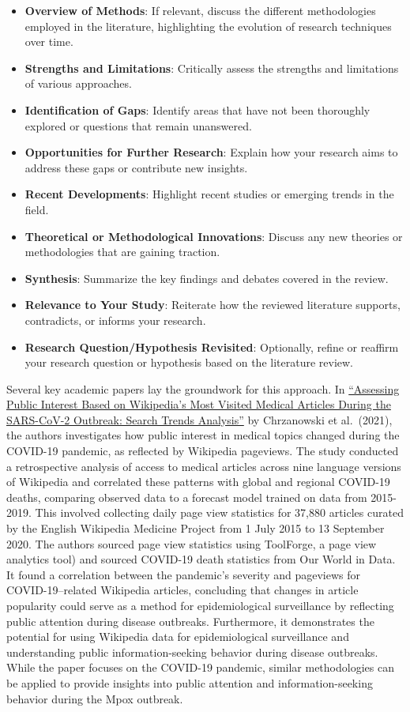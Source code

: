 \documentclass[
  12pt,
]{article}
\begin{document}
\begin{itemize}
\item
  \textbf{Overview of Methods}: If relevant, discuss the different
  methodologies employed in the literature, highlighting the evolution
  of research techniques over time.
\item
  \textbf{Strengths and Limitations}: Critically assess the strengths
  and limitations of various approaches.
\item
  \textbf{Identification of Gaps}: Identify areas that have not been
  thoroughly explored or questions that remain unanswered.
\item
  \textbf{Opportunities for Further Research}: Explain how your research
  aims to address these gaps or contribute new insights.
\item
  \textbf{Recent Developments}: Highlight recent studies or emerging
  trends in the field.
\item
  \textbf{Theoretical or Methodological Innovations}: Discuss any new
  theories or methodologies that are gaining traction.
\item
  \textbf{Synthesis}: Summarize the key findings and debates covered in
  the review.
\item
  \textbf{Relevance to Your Study}: Reiterate how the reviewed
  literature supports, contradicts, or informs your research.
\item
  \textbf{Research Question/Hypothesis Revisited}: Optionally, refine or
  reaffirm your research question or hypothesis based on the literature
  review.
\end{itemize}

Several key academic papers lay the groundwork for this approach. In
\href{https://doi.org/10.2196/26331}{``Assessing Public Interest Based
on Wikipedia's Most Visited Medical Articles During the SARS-CoV-2
Outbreak: Search Trends Analysis''} by Chrzanowski et al.~(2021), the
authors investigates how public interest in medical topics changed
during the COVID-19 pandemic, as reflected by Wikipedia pageviews. The
study conducted a retrospective analysis of access to medical articles
across nine language versions of Wikipedia and correlated these patterns
with global and regional COVID-19 deaths, comparing observed data to a
forecast model trained on data from 2015-2019. This involved collecting
daily page view statistics for 37,880 articles curated by the English
Wikipedia Medicine Project from 1 July 2015 to 13 September 2020. The
authors sourced page view statistics using ToolForge, a page view
analytics tool) and sourced COVID-19 death statistics from Our World in
Data. It found a correlation between the pandemic's severity and
pageviews for COVID-19--related Wikipedia articles, concluding that
changes in article popularity could serve as a method for
epidemiological surveillance by reflecting public attention during
disease outbreaks. Furthermore, it demonstrates the potential for using
Wikipedia data for epidemiological surveillance and understanding public
information-seeking behavior during disease outbreaks. While the paper
focuses on the COVID-19 pandemic, similar methodologies can be applied
to provide insights into public attention and information-seeking
behavior during the Mpox outbreak.
\end{document}
